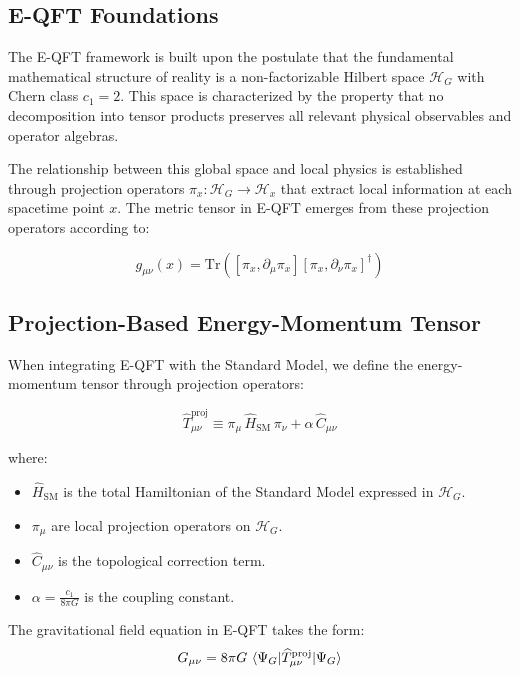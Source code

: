 \documentclass[11pt]{article}
\theoremstyle{definition}
\begin{document}
\subsection{E-QFT Foundations}

The E-QFT framework is built upon the postulate that the fundamental mathematical structure of reality is a non-factorizable Hilbert space $\mathcal{H}_G$ with Chern class $c_1 = 2$. This space is characterized by the property that no decomposition into tensor products preserves all relevant physical observables and operator algebras.

The relationship between this global space and local physics is established through projection operators $\pi_x: \mathcal{H}_G \to \mathcal{H}_x$ that extract local information at each spacetime point $x$. The metric tensor in E-QFT emerges from these projection operators according to:

\begin{equation}
g_{\mu\nu}(x) = \text{Tr}\left([\pi_x, \partial_\mu \pi_x][\pi_x, \partial_\nu \pi_x]^\dagger\right)
\end{equation}

\subsection{Projection-Based Energy-Momentum Tensor}

When integrating E-QFT with the Standard Model, we define the energy-momentum tensor through projection operators:

\begin{equation}
\widehat{T}_{\mu\nu}^{\text{proj}} \equiv \pi_{\mu} \, \widehat{H}_{\text{SM}} \, \pi_{\nu} + \alpha \, \widehat{C}_{\mu\nu}
\end{equation}

where:
\begin{itemize}
	\item $\widehat{H}_{\text{SM}}$ is the total Hamiltonian of the Standard Model expressed in $\mathcal{H}_G$.
	\item $\pi_{\mu}$ are local projection operators on $\mathcal{H}_G$.
	\item $\widehat{C}_{\mu\nu}$ is the topological correction term.
	\item $\alpha = \frac{c_1}{8\pi G}$ is the coupling constant.
\end{itemize}

The gravitational field equation in E-QFT takes the form:
\begin{equation}
G_{\mu\nu} = 8\pi G \, \mel{\Psi_G}{\widehat{T}_{\mu\nu}^{\text{proj}}}{\Psi_G}
\end{equation}
\end{document}
